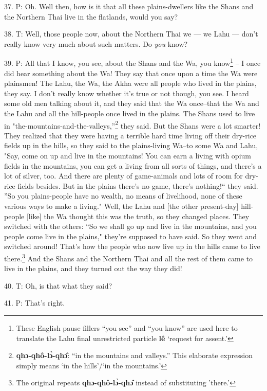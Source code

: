 37. P: Oh. Well then, how is it that all these plains-dwellers like the Shans and
the Northern Thai live in the flatlands, would you say?

38. T: Well, those people now, about the Northern Thai we --- we Lahu --- don't
really know very much about such matters. Do \textit{you} know?

39. P: All that I know, you see, about the Shans and the Wa, you know\footnote{These English pause fillers ``you see'' and ``you know'' are used here to translate the Lahu final unrestricted particle \textbf{lê} `request for assent.'} -- I once
did hear something about the Wa! They say that once upon a time the Wa were plainsmen!
The Lahu, the Wa, the Akha were all people who lived in the plains, they say. I
don't really know whether it's true or not though, you see. I heard some old men
talking about it, and they said that the Wa once--that the Wa and the Lahu and
all the hill-people once lived in the plains. The Shans used to live in "the-mountains-and-the-valleys,''\footnote{\textbf{qhɔ-qhô-lɔ̀-qhɔ̂}: ``in the mountains and valleys.'' This elaborate expression simply means `in the hills'/`in the mountains.'}
they said. But the Shans were a lot smarter! They realized that they were having
a terrible hard time living off their dry-rice fields up in the hills, so they
said to the plains-living Wa--to some Wa and Lahu, "Say, come on up and
live in the mountains! You can earn a living with opium fields in the mountains,
you can get a living from all sorts of things, and there's a lot of silver, too.
And there are plenty of game-animals and lots of room for dry-rice fields besides.
But in the plains there's no game, there's nothing!`` they said. ''So
you plains-people have no wealth, no means of livelihood, none of these various
ways to make a living." Well, the Lahu and [the other present-day] hill-people
[like] the Wa thought this was the truth, so they changed places. They switched
with the others: ``So we shall go up and live in the mountains, and you people
come live in the plains," they're supposed to have said. So they went
and switched around! That's how the people who now live up in the hills came to
live there.\footnote{The original repeats \textbf{qhɔ-qhô-lɔ̀-qhɔ̂} instead of substituting 'there.'} And the Shans and the Northern Thai and all the rest of them came
to live in the plains, and they turned out the way they did!

40. T: Oh, is that what they said?

41. P: That's right.

